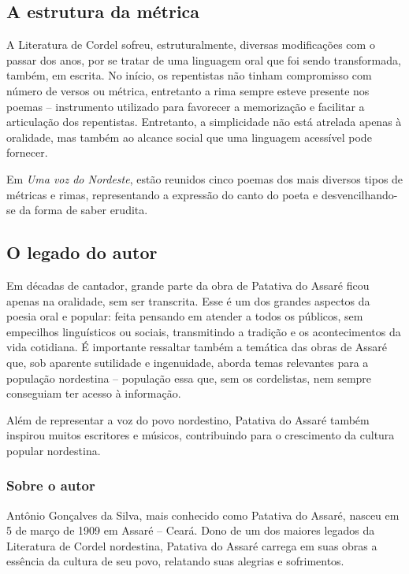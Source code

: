 \documentclass[12pt]{extarticle}
\begin{document}
\subsection{A estrutura da métrica}

A Literatura de Cordel sofreu, estruturalmente, diversas modificações
com o passar dos anos, por se tratar de uma linguagem oral que foi sendo
transformada, também, em escrita. No início, os repentistas não tinham
compromisso com número de versos ou métrica, entretanto a rima sempre
esteve presente nos poemas -- instrumento utilizado para favorecer a
memorização e facilitar a articulação dos repentistas. Entretanto, a
simplicidade não está atrelada apenas à oralidade, mas também ao alcance
social que uma linguagem acessível pode fornecer.

Em \emph{Uma voz do Nordeste}, estão reunidos cinco poemas dos mais
diversos tipos de métricas e rimas, representando a expressão do canto
do poeta e desvencilhando-se da forma de saber erudita.

\subsection{O legado do autor}

Em décadas de cantador, grande parte da obra de Patativa do Assaré ficou
apenas na oralidade, sem ser transcrita. Esse é um dos grandes aspectos
da poesia oral e popular: feita pensando em atender a todos os públicos,
sem empecilhos linguísticos ou sociais, transmitindo a tradição e os
acontecimentos da vida cotidiana. É importante ressaltar também a
temática das obras de Assaré que, sob aparente sutilidade e ingenuidade,
aborda temas relevantes para a população nordestina -- população essa
que, sem os cordelistas, nem sempre conseguiam ter acesso à informação.

Além de representar a voz do povo nordestino, Patativa do Assaré também
inspirou muitos escritores e músicos, contribuindo para o crescimento da
cultura popular nordestina.

\subsubsection{{Sobre o autor}}

Antônio Gonçalves da Silva, mais conhecido como Patativa do Assaré,
nasceu em 5 de março de 1909 em Assaré -- Ceará. Dono de um dos maiores
legados da Literatura de Cordel nordestina, Patativa do Assaré carrega
em suas obras a essência da cultura de seu povo, relatando suas alegrias
e sofrimentos.
\end{document}
